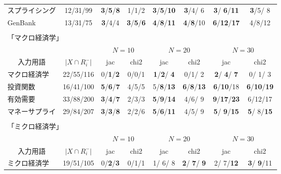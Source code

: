 \begin{table}
\begin{center}
\begin{tabular}{|l|c||cc|cc|cc|}
   スプライシング & 12/31/99 & {\bf 3}/{\bf 5}/{\bf 8} & 1/1/2 & {\bf 3}/{\bf 5}/{\bf 10} & {\bf 3}/4/ 6 & {\bf 3}/ {\bf 6}/{\bf 11} & {\bf 3}/5/ 8 \\ 
   GenBank & 13/31/75 & {\bf 3}/4/4 & {\bf 3}/{\bf 5}/{\bf 6} & {\bf 4}/{\bf 8}/{\bf 11} & {\bf 4}/{\bf 8}/10 & {\bf 6}/{\bf 12}/{\bf 17} & 4/8/12 \\
   \hline
   \multicolumn{8}{c}{\tiny }\\[-5pt]
   \multicolumn{8}{l}{「マクロ経済学」 }\\
   \hline
   \multicolumn{2}{|c||}{} &
   \multicolumn{2}{c}{$N=10$} & 
   \multicolumn{2}{|c}{$N=20$} &
   \multicolumn{2}{|c|}{$N=30$} \\
   \multicolumn{1}{|c}{入力用語} & 
   \multicolumn{1}{c||}{$|X\cap R_i^{-}|$} &
   \multicolumn{1}{c}{jac} &
   \multicolumn{1}{c}{chi2} &
   \multicolumn{1}{|c}{jac} &
   \multicolumn{1}{c}{chi2} &
   \multicolumn{1}{|c}{jac} &
   \multicolumn{1}{c|}{chi2} \\
   \hline
   マクロ経済学 & 22/55/116 & 0/{\bf 1}/{\bf 2} & 0/0/1 & {\bf 1}/{\bf 2}/ {\bf 4} & 0/1/ 2 & {\bf 2}/ {\bf 4}/ {\bf 7} & 0/ 1/ 3 \\ 
   投資関数 & 16/41/100 & {\bf 5}/{\bf 6}/{\bf 7} & 4/5/5 & 5/{\bf 8}/{\bf 13} & {\bf 6}/{\bf 8}/{\bf 13} & {\bf 6}/{\bf 10}/18 & {\bf 6}/{\bf 10}/{\bf 19} \\ 
   有効需要 & 33/88/200 & {\bf 3}/{\bf 4}/{\bf 7} & 2/3/3 & {\bf 5}/{\bf 9}/{\bf 14} & 4/6/ 9 & {\bf 9}/{\bf 17}/{\bf 23} & 6/12/17 \\ 
   マネーサプライ & 29/84/207 & {\bf 3}/{\bf 3}/{\bf 8} & 2/2/6 & {\bf 5}/{\bf 6}/{\bf 11} & 4/5/ 9 & {\bf 5}/ {\bf 9}/{\bf 15} & {\bf 5}/ 8/{\bf 15} \\ 
   \hline
   \multicolumn{8}{c}{\tiny }\\[-5pt]
   \multicolumn{8}{l}{「ミクロ経済学」 }\\
   \hline
   \multicolumn{2}{|c||}{} &
   \multicolumn{2}{c}{$N=10$} & 
   \multicolumn{2}{|c}{$N=20$} &
   \multicolumn{2}{|c|}{$N=30$} \\
   \multicolumn{1}{|c}{入力用語} & 
   \multicolumn{1}{c||}{$|X\cap R_i^{-}|$} &
   \multicolumn{1}{c}{jac} &
   \multicolumn{1}{c}{chi2} &
   \multicolumn{1}{|c}{jac} &
   \multicolumn{1}{c}{chi2} &
   \multicolumn{1}{|c}{jac} &
   \multicolumn{1}{c|}{chi2} \\
   \hline
   ミクロ経済学 & 19/51/105 & 0/{\bf 2}/{\bf 3} & 0/1/1 & 1/ 6/ 8 & {\bf 2}/ {\bf 7}/ {\bf 9} & 2/ 7/{\bf 12} & {\bf 3}/ {\bf 9}/11 \\ 

\end{tabular}
\end{center}
\end{table}

